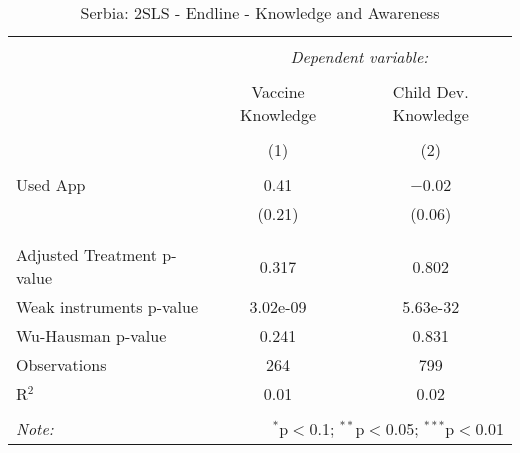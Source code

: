 
\begin{table}[!htbp] \centering 
  \caption{Serbia: 2SLS - Endline - Knowledge and Awareness} 
  \label{tbl:Serbia: 2SLS - Endline - Knowledge and Awareness} 
\begin{tabular}{@{\extracolsep{5pt}}lcc} 
\\[-1.8ex]\hline 
\hline \\[-1.8ex] 
 & \multicolumn{2}{c}{\textit{Dependent variable:}} \\ 
\cline{2-3} 
\\[-1.8ex] & Vaccine Knowledge & Child Dev. Knowledge \\ 
\\[-1.8ex] & (1) & (2)\\ 
\hline \\[-1.8ex] 
 Used App & 0.41 & $-$0.02 \\ 
  & (0.21) & (0.06) \\ 
  & & \\ 
\hline \\[-1.8ex] 
Adjusted Treatment p-value & 0.317 & 0.802 \\ 
Weak instruments p-value & 3.02e-09 & 5.63e-32 \\ 
Wu-Hausman p-value & 0.241 & 0.831 \\ 
Observations & 264 & 799 \\ 
R$^{2}$ & 0.01 & 0.02 \\ 
\hline 
\hline \\[-1.8ex] 
\textit{Note:}  & \multicolumn{2}{r}{$^{*}$p$<$0.1; $^{**}$p$<$0.05; $^{***}$p$<$0.01} \\ 
\end{tabular} 
\end{table} 
